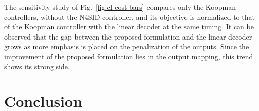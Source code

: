 \documentclass[preprint,12pt,authoryear]{elsarticle}
\theoremstyle{remark}
\begin{document}
The sensitivity study of Fig.~\ref{fig:cl-cost-bars} compares only the Koopman controllers, without the N4SID controller, and its objective is normalized to that of the Koopman controller with the linear decoder at the same tuning. It can be observed that the gap between the proposed formulation and the linear decoder grows as more emphasis is placed on the penalization of the outputs. Since the improvement of the proposed formulation lies in the output mapping, this trend shows its strong side.

\section{Conclusion}



\end{document}

